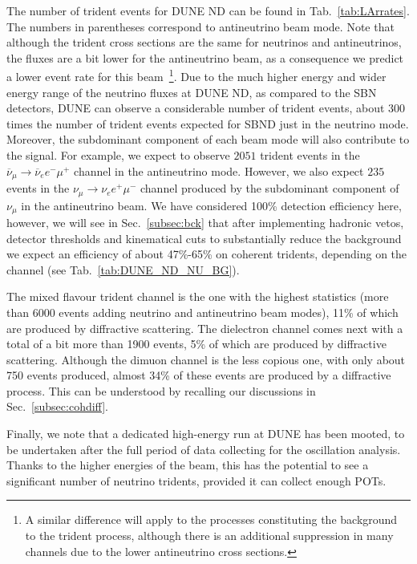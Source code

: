 The number of trident events for DUNE ND can be found in Tab.~\ref{tab:LArrates}. The numbers in parentheses correspond to antineutrino beam mode. Note that although the trident cross sections are the same for neutrinos and antineutrinos, the fluxes are a bit lower for the antineutrino beam, as a consequence we predict a lower event rate for this beam~\footnote{A similar difference will apply to the processes constituting the background to the trident process, although there is an additional suppression in many channels due to the lower antineutrino cross sections.}.
%
Due to the much higher energy and wider energy range of the neutrino fluxes at DUNE ND, as compared to the SBN detectors, DUNE can observe a considerable number of trident events, about 300 times the number of trident events expected for SBND just in the neutrino mode. Moreover, the subdominant component of 
each beam mode will also contribute to the signal. For example, we expect to observe $2051$ trident events in the $\overline{\nu}_\mu\to\overline{\nu}_e e^- \mu^+$ channel in the antineutrino mode. However, we also expect 
$235$ events in the $\nu_\mu\to\nu_e e^+ \mu^-$ channel produced by 
the subdominant component of $\nu_\mu$ in the antineutrino beam.
%
We have considered 100\% detection efficiency here, however, we will see in Sec.~\ref{subsec:bck} that after implementing hadronic vetos, detector thresholds and kinematical cuts to substantially reduce the background we expect an efficiency of about 47\%-65\% on coherent tridents, depending on the channel (see Tab.~\ref{tab:DUNE_ND_NU_BG}).

The mixed flavour trident channel is the one with the highest statistics (more than 6000 events adding 
neutrino and antineutrino beam modes), 11\% of which are produced by diffractive scattering. The dielectron channel comes next with a total of a bit more than 1900 events, 5\%  of which are produced by diffractive scattering. Although the  dimuon channel is the less copious one, with only about 
750 events produced, almost 34\% of these events are produced by a diffractive process.
This can be understood by recalling our discussions in Sec.~\ref{subsec:cohdiff}.

Finally, we note that a dedicated high-energy run at DUNE has been mooted, to be undertaken after the full period of data collecting for the oscillation analysis. Thanks to the higher energies of the beam, this has the potential to see a significant number of neutrino tridents, provided it can collect enough POTs.  

